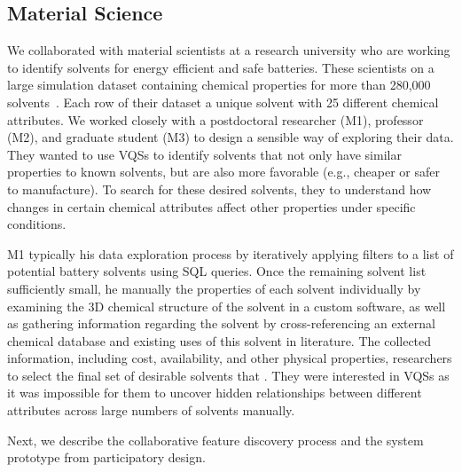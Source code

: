  \subsection{Material Science}
 \par\noindent{} 
 We collaborated with material scientists at a research university who are working to identify solvents for energy efficient and safe batteries. These scientists  on a large simulation dataset containing chemical properties for more than 280,000 solvents~\cite{Khetan2018}. Each row of their dataset  a unique solvent with 25 different chemical attributes. We worked closely with a postdoctoral researcher (M1), professor (M2), and graduate student (M3) to design a sensible way of exploring their data. They wanted to use VQSs to identify solvents that not only have similar properties to known solvents, but are also more favorable (e.g., cheaper or safer to manufacture). To search for these desired solvents, they  to understand how changes in certain chemical attributes affect other properties under specific conditions.
 \par\noindent{} 
 \npar M1 typically  his data exploration process by iteratively applying filters to a list of potential battery solvents using SQL queries. Once the remaining solvent list  sufficiently small, he manually  the properties of each solvent individually by examining the 3D chemical structure of the solvent in a custom software, as well as gathering information regarding the solvent by cross-referencing an external chemical database and existing uses of this solvent in literature. The collected information, including cost, availability, and other physical properties,  researchers to select the final set of desirable solvents that . They were interested in VQSs as it was impossible for them to uncover hidden relationships between different attributes across large numbers of solvents manually.%
 \par Next, we describe the collaborative feature discovery process and the system prototype from participatory design.
 
